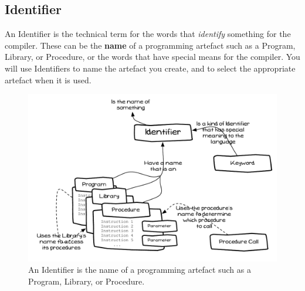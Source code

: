 \clearpage
\subsection{Identifier} %
\label{sec:program-creation-identifier}

An Identifier is the technical term for the words that \emph{identify} something for the compiler. These can be the \textbf{name} of a programming artefact such as a Program, Library, or Procedure, or the words that have special means for the compiler. You will use Identifiers to name the artefact you create, and to select the appropriate artefact when it is used.

\begin{figure}[h]
   \centering
   \includegraphics[width=\textwidth]{./topics/program-creation/diagrams/Identifier} 
   \caption[Identifier Concept Diagram]{An Identifier is the name of a programming artefact such as a Program, Library, or Procedure.}
   \label{fig:program-creation-identifier}
\end{figure}



